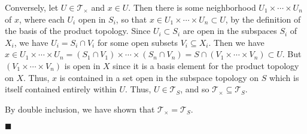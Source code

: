 \documentclass[12pt]{article}
\renewcommand{\qed}{\hfill$\blacksquare$}
\renewenvironment{proof}{\begin{addmargin}[1em]{0em}\begin{newproof}}{\end{newproof}\end{addmargin}\qed}
\begin{document}
\begin{proof}
\begin{itemize}
	Conversely, let $U\in \mathcal{T}_{\times}$ and $x\in U$. Then there is some neighborhood $U_1 \times \cdots \times U_n$ of $x$, where each $U_i$ open in $S_i$, so that $x \in U_1 \times \cdots \times U_n \subset U$, by the definition of the basis of the product topology. Since $U_i \subset S_i$ are open in the subspaces $S_i $ of $X_i$, we have $U_i = S_i \cap V_i$ for some open subsets $V_i \subseteq X_i$. Then we have $x \in U_1 \times \cdots \times U_n = \left(S_1\cap V_1\right)\times \cdots \times \left(S_n\cap V_n\right) = S\cap \left(V_1 \times \cdots \times V_n\right) \subset U$. But $\left(V_1 \times \cdots \times V_n\right)$ is open in $X$ since it is a basis element for the product topology on $X$. Thus, $x$ is contained in a set open in the subspace topology on $S$ which is itself contained entirely within $U$. Thus, $U \in \mathcal{T}_S$, and so $\mathcal{T}_{\times} \subseteq \mathcal{T}_S$.

By double inclusion, we have shown that $\mathcal{T}_{\times} = \mathcal{T}_S$.


\end{itemize}
\end{proof}
\end{document}
